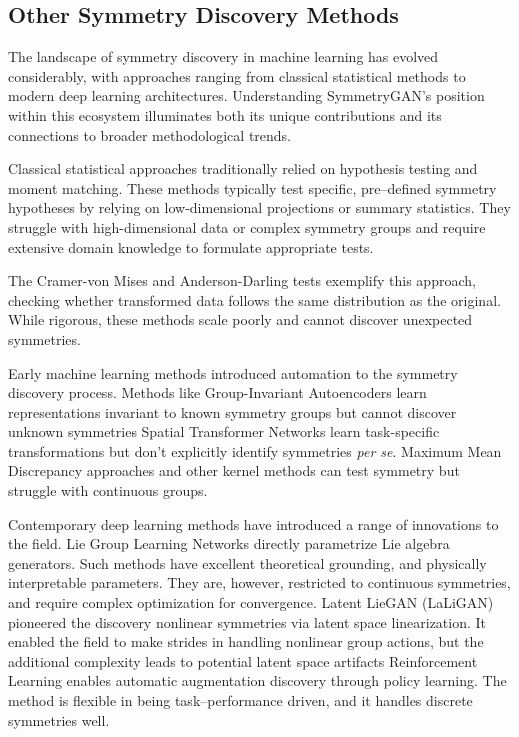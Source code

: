     \subsection{Other Symmetry Discovery Methods}
        The landscape of symmetry discovery in machine learning has evolved considerably, with approaches ranging from classical statistical methods to modern deep learning architectures.
        Understanding SymmetryGAN's position within this ecosystem illuminates both its unique contributions and its connections to broader methodological trends.

        Classical statistical approaches traditionally relied on hypothesis testing and moment matching.
        These methods typically test specific, pre--defined symmetry hypotheses by relying on low-dimensional projections or summary statistics.
        They struggle with high-dimensional data or complex symmetry groups and require extensive domain knowledge to formulate appropriate tests.

        The Cramer-von Mises and Anderson-Darling tests exemplify this approach, checking whether transformed data follows the same distribution as the original.
        While rigorous, these methods scale poorly and cannot discover unexpected symmetries.

        Early machine learning methods introduced automation to the symmetry discovery process.
        Methods like Group-Invariant Autoencoders learn representations invariant to known symmetry groups but cannot discover unknown symmetries
        Spatial Transformer Networks learn task-specific transformations but don't explicitly identify symmetries \textit{per se}.
        Maximum Mean Discrepancy approaches and other kernel methods can test symmetry but struggle with continuous groups.

        Contemporary deep learning methods have introduced a range of innovations to the field.
        Lie Group Learning Networks directly parametrize Lie algebra generators.
        Such methods have excellent theoretical grounding, and physically interpretable parameters.
        They are, however, restricted to continuous symmetries, and require complex optimization for convergence.
        Latent LieGAN (LaLiGAN) pioneered the discovery nonlinear symmetries via latent space linearization.
        It enabled the field to make strides in handling nonlinear group actions, but the additional complexity leads to potential latent space artifacts
        Reinforcement Learning enables automatic augmentation discovery through policy learning.
        The method is flexible in being task--performance driven, and it handles discrete symmetries well.

